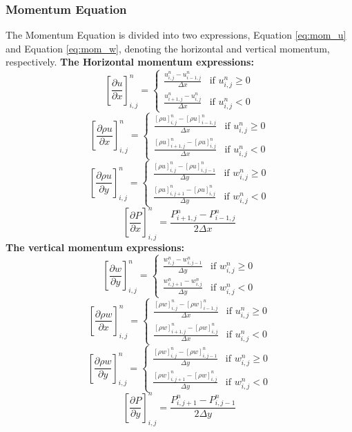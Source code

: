 \documentclass[10pt, nofootinbib, twocolumn]{revtex4-1}
\begin{document}
\subsubsection{Momentum Equation}
The Momentum Equation is divided into two expressions, Equation \eqref{eq:mom_u} and Equation \eqref{eq:mom_w}, denoting the horizontal and vertical momentum, respectively. \textbf{The Horizontal momentum expressions:}
\[\left[\frac{\partial u}{\partial x}\right]^{n}_{i,j} = 
\begin{cases}
\frac{u_{i,j}^{n}-u_{i-1,j}^{n}}{\Delta x} & \text{if } u_{i,j}^{n} \geq 0 \\
\frac{u_{i+1,j}^{n}-u_{i,j}^{n}}{\Delta x} & \text{if } u_{i,j}^{n} < 0
\end{cases}\]
\[\left[\frac{\partial \rho u}{\partial x}\right]^{n}_{i,j} = 
\begin{cases}
\frac{[\rho u]_{i,j}^{n}-[\rho u]_{i-1,j}^{n}}{\Delta x} & \text{if } u_{i,j}^{n} \geq 0 \\
\frac{[\rho u]_{i+1,j}^{n}-[\rho u]_{i,j}^{n}}{\Delta x} & \text{if } u_{i,j}^{n} < 0
\end{cases}\]
\[\left[\frac{\partial \rho u}{\partial y}\right]^{n}_{i,j} = 
\begin{cases}
\frac{[\rho u]_{i,j}^{n}-[\rho u]_{i,j-1}^{n}}{\Delta y} & \text{if } w_{i,j}^{n} \geq 0 \\
\frac{[\rho u]_{i,j+1}^{n}-[\rho u]_{i,j}^{n}}{\Delta y} & \text{if } w_{i,j}^{n} < 0
\end{cases}\]
$$\left[\frac{\partial P}{\partial x}\right]^{n}_{i,j} = \frac{P_{i+1,j}^{n}-P_{i-1,j}^{n}}{2\Delta x}$$
\textbf{The vertical momentum expressions:}
\[\left[\frac{\partial w}{\partial y}\right]^{n}_{i,j} = 
\begin{cases}
\frac{w_{i,j}^{n}-w_{i,j-1}^{n}}{\Delta y} & \text{if } w_{i,j}^{n} \geq 0 \\
\frac{w_{i,j+1}^{n}-w_{i,j}^{n}}{\Delta y} & \text{if } w_{i,j}^{n} < 0
\end{cases}\]
\[\left[\frac{\partial \rho w}{\partial x}\right]^{n}_{i,j} = 
\begin{cases}
\frac{[\rho w]_{i,j}^{n}-[\rho w]_{i-1,j}^{n}}{\Delta x} & \text{if } u_{i,j}^{n} \geq 0 \\
\frac{[\rho w]_{i+1,j}^{n}-[\rho w]_{i,j}^{n}}{\Delta x} & \text{if } u_{i,j}^{n} < 0
\end{cases}\]
\[\left[\frac{\partial \rho w}{\partial y}\right]^{n}_{i,j} = 
\begin{cases}
\frac{[\rho w]_{i,j}^{n}-[\rho w]_{i,j-1}^{n}}{\Delta y} & \text{if } w_{i,j}^{n} \geq 0 \\
\frac{[\rho w]_{i,j+1}^{n}-[\rho w]_{i,j}^{n}}{\Delta y} & \text{if } w_{i,j}^{n} < 0
\end{cases}\]
$$\left[\frac{\partial P}{\partial y}\right]^{n}_{i,j} = \frac{P_{i,j+1}^{n}-P_{i,j-1}^{n}}{2\Delta y}$$
\end{document}
